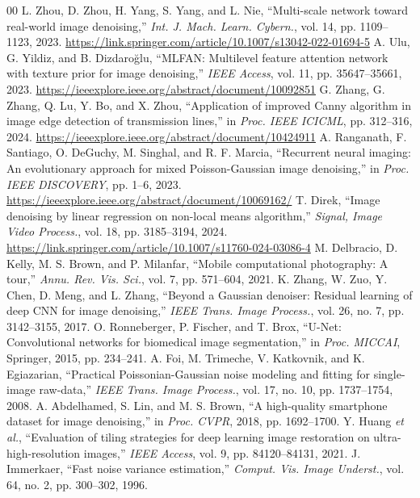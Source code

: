 \documentclass{ieeeaccess}
\begin{document}
\begin{thebibliography}{00}
 L. Zhou, D. Zhou, H. Yang, S. Yang, and L. Nie, ``Multi-scale network toward real-world image denoising,'' \textit{Int. J. Mach. Learn. Cybern.}, vol. 14, pp. 1109--1123, 2023. \url{https://link.springer.com/article/10.1007/s13042-022-01694-5}
 A. Ulu, G. Yildiz, and B. Dizdaroğlu, ``MLFAN: Multilevel feature attention network with texture prior for image denoising,'' \textit{IEEE Access}, vol. 11, pp. 35647--35661, 2023. \url{https://ieeexplore.ieee.org/abstract/document/10092851}
 G. Zhang, G. Zhang, Q. Lu, Y. Bo, and X. Zhou, ``Application of improved Canny algorithm in image edge detection of transmission lines,'' in \textit{Proc. IEEE ICICML}, pp. 312--316, 2024. \url{https://ieeexplore.ieee.org/abstract/document/10424911}
 A. Ranganath, F. Santiago, O. DeGuchy, M. Singhal, and R. F. Marcia, ``Recurrent neural imaging: An evolutionary approach for mixed Poisson-Gaussian image denoising,'' in \textit{Proc. IEEE DISCOVERY}, pp. 1--6, 2023. \url{https://ieeexplore.ieee.org/abstract/document/10069162/}
 T. Direk, ``Image denoising by linear regression on non-local means algorithm,'' \textit{Signal, Image Video Process.}, vol. 18, pp. 3185--3194, 2024. \url{https://link.springer.com/article/10.1007/s11760-024-03086-4}
 M. Delbracio, D. Kelly, M. S. Brown, and P. Milanfar, ``Mobile computational photography: A tour,'' \textit{Annu. Rev. Vis. Sci.}, vol. 7, pp. 571--604, 2021.
 K. Zhang, W. Zuo, Y. Chen, D. Meng, and L. Zhang, ``Beyond a Gaussian denoiser: Residual learning of deep CNN for image denoising,'' \textit{IEEE Trans. Image Process.}, vol. 26, no. 7, pp. 3142--3155, 2017.
 O. Ronneberger, P. Fischer, and T. Brox, ``U-Net: Convolutional networks for biomedical image segmentation,'' in \textit{Proc. MICCAI}, Springer, 2015, pp. 234--241.
 A. Foi, M. Trimeche, V. Katkovnik, and K. Egiazarian, ``Practical Poissonian-Gaussian noise modeling and fitting for single-image raw-data,'' \textit{IEEE Trans. Image Process.}, vol. 17, no. 10, pp. 1737--1754, 2008.
 A. Abdelhamed, S. Lin, and M. S. Brown, ``A high-quality smartphone dataset for image denoising,'' in \textit{Proc. CVPR}, 2018, pp. 1692--1700.
 Y. Huang \textit{et al.}, ``Evaluation of tiling strategies for deep learning image restoration on ultra-high-resolution images,'' \textit{IEEE Access}, vol. 9, pp. 84120--84131, 2021.
 J. Immerkaer, ``Fast noise variance estimation,'' \textit{Comput. Vis. Image Underst.}, vol. 64, no. 2, pp. 300--302, 1996.
\end{thebibliography}
\end{document}
